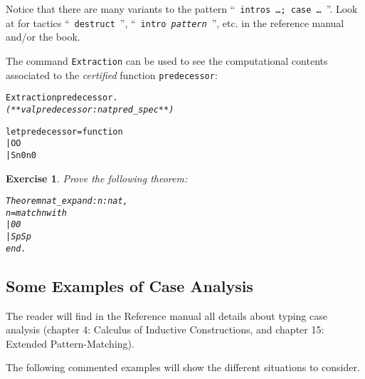 \documentclass[11pt]{article}
\newcommand{\refmancite}[1]{{}}
\newtheorem{exercise}{Exercise}[section]
\begin{document}
Notice that there are many variants to the pattern ``~\texttt{intros \dots; case \dots}~''. Look at for tactics
``~\texttt{destruct}~'', ``~\texttt{intro \emph{pattern}}~'', etc. in 
the reference manual and/or the book. 

\noindent The command \texttt{Extraction} \refmancite{Section
\ref{ExtractionIdent}} can be used to see the computational
contents associated to the \emph{certified} function \texttt{predecessor}:
\begin{alltt}
Extraction predecessor.
\it
(** val predecessor : nat {\arrow} pred_spec **)

let predecessor = function
  | O {\arrow} O
  | S n0 {\arrow} n0
\end{alltt}


\begin{exercise} \label{expand}
Prove the following theorem:
\begin{alltt}
Theorem nat_expand : {\prodsym} n:nat, 
      n = match n with 
                  | 0 {\funarrow} 0 
                  | S p {\funarrow} S p 
          end.
\end{alltt}
\end{exercise}

\subsection{Some Examples of Case Analysis}
\label{CaseScheme}
The reader will find in the Reference manual all details about
typing case analysis (chapter 4: Calculus of Inductive Constructions,
and chapter 15: Extended Pattern-Matching).

The following commented examples will show the different situations to consider.



\end{document}
